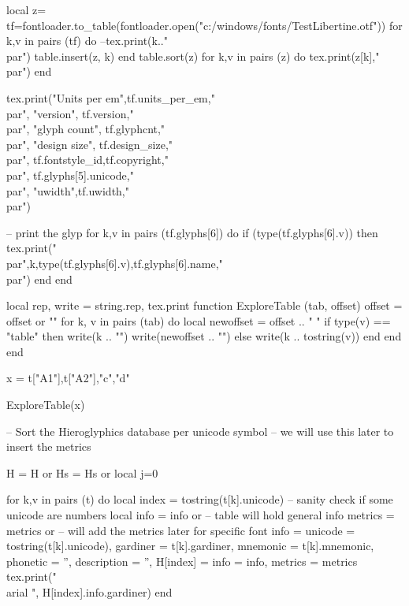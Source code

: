 \documentclass{article}
\begin{document}
\begin{luacode*}
local z={}
tf=fontloader.to_table(fontloader.open("c:/windows/fonts/TestLibertine.otf"))
for k,v in pairs (tf) do
   --tex.print(k.."\\par")
   table.insert(z, k)
end
table.sort(z)
for k,v in pairs (z) do
  tex.print(z[k],"\\par")
end


tex.print("Units per em",tf.units_per_em,"\\par",
          "version", tf.version,"\\par",
          "glyph count", tf.glyphcnt,"\\par",
          "design size", tf.design_size,"\\par",
           tf.fontstyle_id,tf.copyright,"\\par",
           tf.glyphs[5].unicode,"\\par", "uwidth",tf.uwidth,"\\par")

-- print the glyp
for k,v in pairs (tf.glyphs[6]) do
    if (type(tf.glyphs[6].v)) then tex.print("\\par",k,type(tf.glyphs[6].v),tf.glyphs[6].name,"\\par")  end
end

local rep, write = string.rep, tex.print
function ExploreTable (tab, offset)
    offset = offset or ""
    for k, v in pairs (tab) do
        local newoffset = offset .. "   "
        if type(v) == "table" then
           write(k .. "{")
           write(newoffset .. "}")
         else
            write(k .. tostring(v))
         end
      end
end

x = {t["A1"],t["A2"],"c","d"}

ExploreTable(x)


-- Sort the Hieroglyphics database per unicode symbol
-- we will use this later to insert the metrics

H  = H or {}
Hs = Hs or {}
local j=0

for k,v in pairs (t) do
    local index = tostring(t[k].unicode)                -- sanity check if some unicode are numbers
    local info  = info or {}                            -- table will hold general info
    metrics     = metrics or {}                         -- will add the metrics later for specific font
    info        = {unicode     = tostring(t[k].unicode),
                   gardiner    = t[k].gardiner,
                   mnemonic    = t[k].mnemonic,
                   phonetic    = '',
                   description = '',}
    H[index]    = {info        = info, 
                   metrics     = metrics}
    tex.print("\\arial ", H[index].info.gardiner)
end


\end{luacode*}
\end{document}
